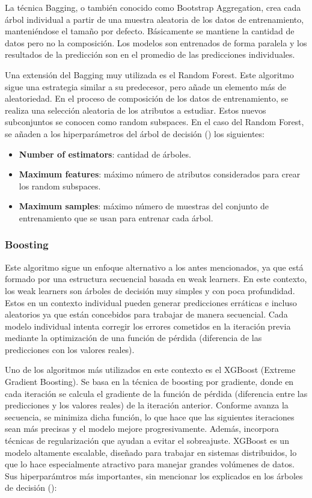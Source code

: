 \documentclass[12pt,a4paper]{report}
\begin{document}
La técnica Bagging, o también conocido como Bootstrap Aggregation, crea cada árbol individual a partir de una muestra aleatoria de los datos de entrenamiento, manteniéndose el tamaño por defecto. Básicamente se mantiene la cantidad de datos pero no la composición. Los modelos son entrenados de forma paralela y los resultados de la predicción son en el promedio de las predicciones individuales.

Una extensión del Bagging muy utilizada es el Random Forest. Este algoritmo sigue una estrategia similar a su predecesor, pero añade un elemento más de aleatoriedad. En el proceso de composición de los datos de entrenamiento, se realiza una selección aleatoria de los atributos a estudiar. Estos nuevos subconjuntos se conocen como random subspaces. En el caso del Random Forest, se añaden a los hiperparámetros del árbol de decisión (\cite{sklearn_random_forest_regressor}) los siguientes:

\begin{itemize}
    \item \textbf{Number of estimators}: cantidad de árboles.

    \item \textbf{Maximum features}: máximo número de atributos considerados para crear los random subspaces.

    \item \textbf{Maximum samples}:  máximo número de muestras del conjunto de entrenamiento que se usan para entrenar cada árbol.
\end{itemize}

\subsubsection{Boosting}

Este algoritmo sigue un enfoque alternativo a los antes mencionados, ya que está formado por una estructura secuencial basada en weak learners. En este contexto, los weak learners son árboles de decisión muy simples y con poca profundidad. Estos en un contexto individual pueden generar predicciones erráticas e incluso aleatorios ya que están concebidos para trabajar de manera secuencial. Cada modelo individual intenta corregir los errores cometidos en la iteración previa mediante la optimización de una función de pérdida (diferencia de las predicciones con los valores reales).

Uno de los algoritmos más utilizados en este contexto es el XGBoost (Extreme Gradient Boosting). Se basa en la técnica de boosting por gradiente, donde en cada iteración se calcula el gradiente de la función de pérdida (diferencia entre las predicciones y los valores reales) de la iteración anterior. Conforme avanza la secuencia, se minimiza dicha función, lo que hace que las siguientes iteraciones sean más precisas y el modelo mejore progresivamente. Además, incorpora técnicas de regularización que ayudan a evitar el sobreajuste. XGBoost es un modelo altamente escalable, diseñado para trabajar en sistemas distribuidos, lo que lo hace especialmente atractivo para manejar grandes volúmenes de datos. Sus hiperparámtros más importantes, sin mencionar los explicados en los árboles de decisión (\cite{sklearn_random_forest_regressor}):
\end{document}
